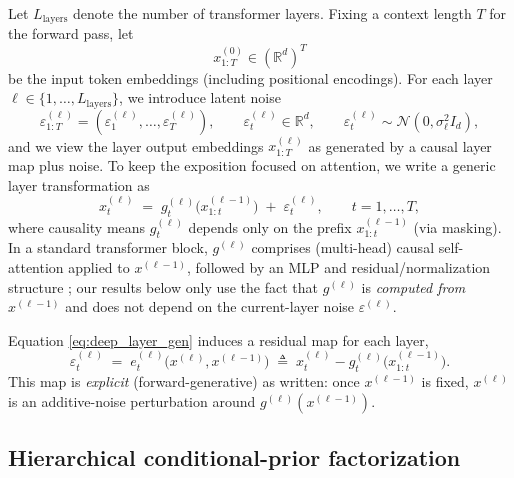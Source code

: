 \documentclass[11pt]{article}
\begin{document}
Let $L_{\mathrm{layers}}$ denote the number of transformer layers. Fixing a context length $T$ for the forward pass, let
\[
x^{(0)}_{1:T}\in(\mathbb{R}^d)^T
\]
be the input token embeddings (including positional encodings).
For each layer $\ell\in\{1,\dots,L_{\mathrm{layers}}\}$, we introduce latent noise
\[
\varepsilon^{(\ell)}_{1:T}=(\varepsilon^{(\ell)}_1,\dots,\varepsilon^{(\ell)}_T),\qquad
\varepsilon^{(\ell)}_t\in\mathbb{R}^d,\qquad
\varepsilon^{(\ell)}_t\sim\mathcal{N}(0,\sigma_\ell^2 I_d),
\]
and we view the layer output embeddings $x^{(\ell)}_{1:T}$ as generated by a causal layer map plus noise.
To keep the exposition focused on attention, we write a generic layer transformation as
\begin{equation}
x^{(\ell)}_t \;=\; g^{(\ell)}_t\!\big(x^{(\ell-1)}_{1:t}\big) \;+\; \varepsilon^{(\ell)}_t,
\qquad t=1,\dots,T,
\label{eq:deep_layer_gen}
\end{equation}
where causality means $g^{(\ell)}_t$ depends only on the prefix $x^{(\ell-1)}_{1:t}$ (via masking).
In a standard transformer block, $g^{(\ell)}$ comprises (multi-head) causal self-attention applied to
$x^{(\ell-1)}$, followed by an MLP and residual/normalization structure \citep{VaswaniShPaUsJoGoKaPo17,XiongZoLiSo16}; our results below only use the
fact that $g^{(\ell)}$ is \emph{computed from} $x^{(\ell-1)}$ and does not depend on the current-layer
noise $\varepsilon^{(\ell)}$.

Equation \eqref{eq:deep_layer_gen} induces a residual map for each layer,
\begin{equation}
\varepsilon^{(\ell)}_t
\;=\;
e^{(\ell)}_t\!\big(x^{(\ell)},x^{(\ell-1)}\big)
\;\triangleq\;
x^{(\ell)}_t - g^{(\ell)}_t\!\big(x^{(\ell-1)}_{1:t}\big).
\label{eq:deep_residual_map}
\end{equation}
This map is \emph{explicit} (forward-generative) as written: once $x^{(\ell-1)}$ is fixed,
$x^{(\ell)}$ is an additive-noise perturbation around $g^{(\ell)}(x^{(\ell-1)})$.

\subsection{Hierarchical conditional-prior factorization}
\label{subsec:deep_factorization}
\end{document}
